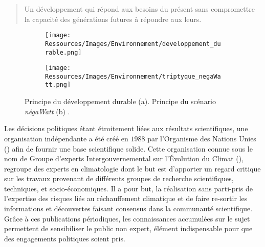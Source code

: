 \blockquote{
    Un développement qui répond aux besoins du présent sans
    compromettre la capacité des générations futures à répondre aux leurs.
}

\begin{figure}
    \centering
    \begin{subfigure}[b]{0.55\textwidth}
        \centering
        \texttt{[image: Ressources/Images/Environnement/developpement\_durable.png]}
        \caption{}
        \label{fig:developpement_durable}
    \end{subfigure}
    \quad
    \begin{subfigure}[b]{0.4\textwidth}
        \centering
        \texttt{[image: Ressources/Images/Environnement/triptyque\_negaWatt.png]}
        \caption{}
        \label{fig:negawatt_axes}
    \end{subfigure}
    \caption[Principe du développement durable et du scénario négaWatt]
             {Principe du développement durable \protect\footnotemark (a). Principe du
              scénario \textit{négaWatt} (b) \parencite{Salomon2012}.}
    \label{fig:developpement_durable_negawatt}
\end{figure}

Les décisions politiques étant étroitement liées aux résultats scientifiques,
une organisation indépendante a été créé en $1988$ par l’Organisme des Nations
Unies () afin de fournir une base scientifique solide. Cette organisation connue sous le nom de
Groupe d'experts Intergouvernemental sur l'Évolution du Climat (), regroupe
des experts en climatologie dont le but est d’apporter un regard critique sur
les travaux provenant de différents groupes de recherche scientifiques, techniques,
et socio-économiques. Il a pour but, la réalisation sans parti-pris de l’expertise
des risques liés au réchauffement climatique et de faire re-sortir les informations
et découvertes faisant consensus dans la communauté scientifique. Grâce à ces
publications périodiques, les connaissances accumulées sur le sujet permettent de
sensibiliser le public non expert, élément indispensable pour que des engagements
politiques soient pris.

